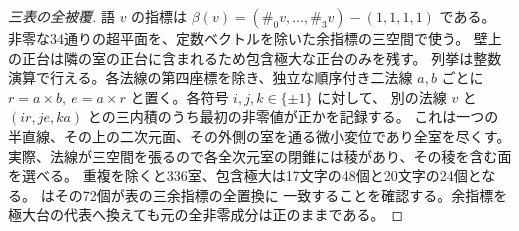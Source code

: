 \begin{proof}[三表の全被覆]
語 $v$ の指標は $\beta(v)=(\#_0v,\ldots,\#_3v)-(1,1,1,1)$ である。
非零な34通りの超平面を、定数ベクトルを除いた余指標の三空間で使う。
壁上の正台は隣の室の正台に含まれるため包含極大な正台のみを残す。
列挙は整数演算で行える。各法線の第四座標を除き、独立な順序付き二法線 $a,b$ ごとに
$r=a\times b,\ e=a\times r$ と置く。各符号 $i,j,k\in\{\pm1\}$ に対して、
別の法線 $v$ と $(ir,je,ka)$ との三内積のうち最初の非零値が正かを記録する。
これは一つの半直線、その上の二次元面、その外側の室を通る微小変位であり全室を尽くす。
実際、法線が三空間を張るので各全次元室の閉錐には稜があり、その稜を含む面を選べる。
重複を除くと336室、包含極大は17文字の48個と20文字の24個となる。
 はその72個が表の三余指標の全置換に
一致することを確認する。余指標を極大台の代表へ換えても元の全非零成分は正のままである。
\end{proof}

